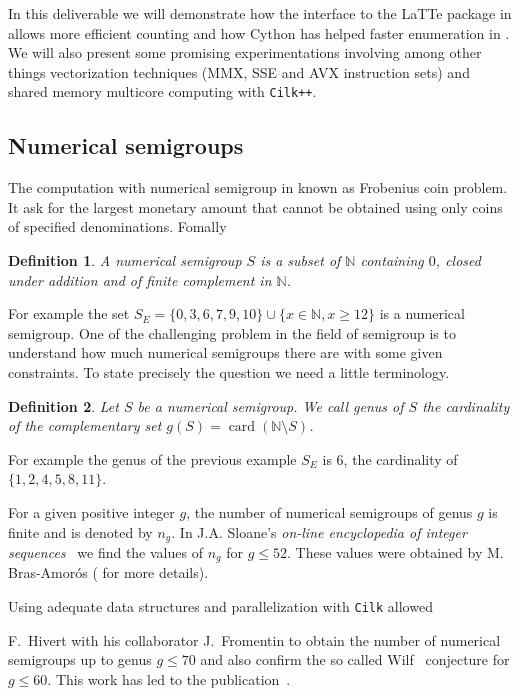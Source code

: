 \documentclass{deliverablereport}
\newcommand{\Cilk}{\texttt{Cilk}\xspace}
\newcommand{\CilkP}{\texttt{Cilk++}\xspace}
\newcommand{\NN}{\mathbb{N}}
\newtheorem{defi}{Definition}
\begin{document}
In this deliverable we will demonstrate how the interface to the LaTTe package
in \Sage allows more efficient counting and how Cython has helped faster enumeration
in \Sage. We will also present some promising experimentations involving among
other things vectorization techniques (MMX, SSE and AVX instruction sets) and
shared memory multicore computing with \CilkP.

\subsection{Numerical semigroups}

The computation with numerical semigroup in known as Frobenius coin
problem. It ask for the largest monetary amount that cannot be obtained using
only coins of specified denominations. Fomally
\begin{defi}
  A \emph{numerical semigroup} $S$ is a subset of $\NN$ containing $0$, closed
  under addition and of finite complement in $\NN$.
\end{defi}
For example the set $S_E=\{0,3,6,7,9,10\}\cup\{x\in\NN, x\geq 12\}$
is a numerical semigroup. One of the challenging problem in the field of
semigroup is to understand how much numerical semigroups there are with some
given constraints. To state precisely the question we need a little
terminology.
\begin{defi}
  Let $S$ be a numerical semigroup. We call \emph{genus} of $S$ the
  cardinality of the complementary set $g(S)=\operatorname{card}(\NN\setminus
  S)$.
\end{defi}
For example the genus of the previous example $S_E$ is $6$, the cardinality of
$\{1,2,4,5,8,11\}$.

For a given positive integer $g$, the number of numerical semigroups of genus
$g$ is finite and is denoted by $n_g$. In J.A. Sloane's \emph{on-line
encyclopedia of integer sequences}~\cite{OEIS} we find the values of $n_g$
for $g\leq 52$. These values were obtained by M. Bras-Amor\'os
(\cite{BrasAmoros2008} for more details). 

Using adequate data structures and parallelization with \Cilk allowed

F.~Hivert with his collaborator J.~Fromentin to obtain the number of numerical
semigroups up to genus $g \leq 70$ and also confirm the so called
Wilf~\cite{Wilf} conjecture for $g \leq 60$. This work has led to the
publication~\cite{FromentinH16}.
\end{document}
